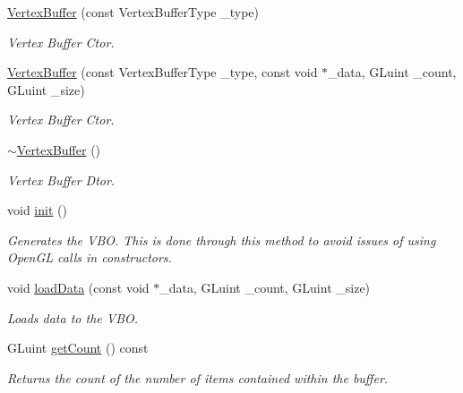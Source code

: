 \begin{DoxyCompactItemize}
\item 
\hyperlink{class_cookie_eng_1_1_graphics_1_1_vertex_buffer_ac877c409fdb8a09947bb13664b78a335}{Vertex\+Buffer} (const Vertex\+Buffer\+Type \+\_\+type)
\begin{DoxyCompactList}\small\item\em Vertex Buffer Ctor. \end{DoxyCompactList}\item 
\hyperlink{class_cookie_eng_1_1_graphics_1_1_vertex_buffer_af4ceb32a35ff5747f2f80c8cec1e7800}{Vertex\+Buffer} (const Vertex\+Buffer\+Type \+\_\+type, const void $\ast$\+\_\+data, G\+Luint \+\_\+count, G\+Luint \+\_\+size)
\begin{DoxyCompactList}\small\item\em Vertex Buffer Ctor. \end{DoxyCompactList}\item 
\hyperlink{class_cookie_eng_1_1_graphics_1_1_vertex_buffer_a7c664866737550113380e8f08feca778}{$\sim$\+Vertex\+Buffer} ()
\begin{DoxyCompactList}\small\item\em Vertex Buffer Dtor. \end{DoxyCompactList}\item 
\mbox{\label{class_cookie_eng_1_1_graphics_1_1_vertex_buffer_a67b3089f2822a48fe31c84e94d087d68}} 
void \hyperlink{class_cookie_eng_1_1_graphics_1_1_vertex_buffer_a67b3089f2822a48fe31c84e94d087d68}{init} ()
\begin{DoxyCompactList}\small\item\em Generates the V\+BO. This is done through this method to avoid issues of using Open\+GL calls in constructors. \end{DoxyCompactList}\item 
void \hyperlink{class_cookie_eng_1_1_graphics_1_1_vertex_buffer_ac3db6a2571101d1836fab492971c75fa}{load\+Data} (const void $\ast$\+\_\+data, G\+Luint \+\_\+count, G\+Luint \+\_\+size)
\begin{DoxyCompactList}\small\item\em Loads data to the V\+BO. \end{DoxyCompactList}\item 
G\+Luint \hyperlink{class_cookie_eng_1_1_graphics_1_1_vertex_buffer_a667b81c15525bd5f76d979e0c8b02be0}{get\+Count} () const
\begin{DoxyCompactList}\small\item\em Returns the count of the number of items contained within the buffer. \end{DoxyCompactList}\item 

\end{DoxyCompactItemize}
